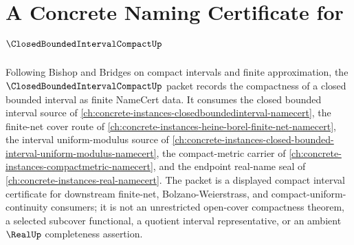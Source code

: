 \chapter{A Concrete Naming Certificate for $\ClosedBoundedIntervalCompactUp$}
\label{ch:concrete-instances-closed-bounded-interval-compact-namecert}

Following Bishop and Bridges on compact intervals and finite approximation, the $\ClosedBoundedIntervalCompactUp$ packet records the compactness of a closed bounded interval as finite NameCert data. It consumes the closed bounded interval source of \autoref{ch:concrete-instances-closedboundedinterval-namecert}, the finite-net cover route of \autoref{ch:concrete-instances-heine-borel-finite-net-namecert}, the interval uniform-modulus source of \autoref{ch:concrete-instances-closed-bounded-interval-uniform-modulus-namecert}, the compact-metric carrier of \autoref{ch:concrete-instances-compactmetric-namecert}, and the endpoint real-name seal of \autoref{ch:concrete-instances-real-namecert}. The packet is a displayed compact interval certificate for downstream finite-net, Bolzano-Weierstrass, and compact-uniform-continuity consumers; it is not an unrestricted open-cover compactness theorem, a selected subcover functional, a quotient interval representative, or an ambient $\RealUp$ completeness assertion.

